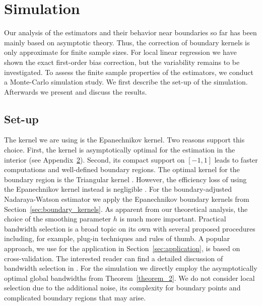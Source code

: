 


\section{Simulation} \label{sec:simulation}

Our analysis of the estimators and their behavior near boundaries so far has been mainly based on asymptotic theory.
Thus, the correction of boundary kernels is only approximate for finite sample sizes.
For local linear regression we have shown the exact first-order bias correction, but the variability remains to be investigated.
To assess the finite sample properties of the estimators, we conduct a Monte-Carlo simulation study.
We first describe the set-up of the simulation.
Afterwards we present and discuss the results. 

\subsection{Set-up}

The kernel we are using is the Epanechnikov kernel.
Two reasons support this choice.
First, the kernel is asymptotically optimal for the estimation in the interior (see Appendix~\hyperref[appendix_2]{2}).
Second, its compact support on $[-1, 1]$ leads to faster computations and well-defined boundary regions.
The optimal kernel for the boundary region is the Triangular kernel \parencite{Cheng_1997}.
However, the efficiency loss of using the Epanechnikov kernel instead is negligible \parencite[684]{Hansen_2022}.
For the boundary-adjusted Nadaraya-Watson estimator we apply the Epanechnikov boundary kernels from Section~\ref{sec:boundary_kernels}.
As apparent from our theoretical analysis, the choice of the smoothing parameter $h$ is much more important.
Practical bandwidth selection is a broad topic on its own with several proposed procedures including, for example,
plug-in techniques and rules of thumb.
A popular approach, we use for the application in Section~\ref{sec:application}, is based on cross-validation.
The interested reader can find a detailed discussion of bandwidth selection in \textcite[Sections 3, 5.8]{Wand_1995}.
For the simulation we directly employ the asymptotically optimal global bandwidths from Theorem~\ref{theorem_2}.
We do not consider local selection due to the additional noise, its complexity for boundary points and complicated boundary regions that may arise.

